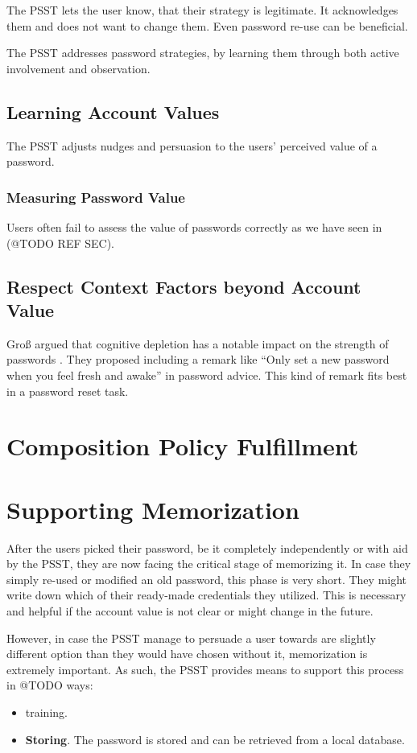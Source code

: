 The PSST lets the user know, that their strategy is legitimate. It acknowledges them and does not want to change them.  Even password re-use can be beneficial.

The PSST addresses password strategies, by learning them through both active involvement and observation. 


\subsection{Learning Account Values}
The PSST adjusts nudges and persuasion to the users' perceived value of a password. 

\subsubsection{Measuring Password Value}
Users often fail to assess the value of passwords correctly as we have seen in (@TODO REF SEC). 

\subsection{Respect Context Factors beyond Account Value}
Groß \etal argued that cognitive depletion has a notable impact on the strength of passwords \cite{Gross2016EffectCognitiveEffort}. They proposed including a remark like ``Only set a new password when you feel fresh and awake'' in password advice. This kind of remark fits best in a password reset task. 


\section{Composition Policy Fulfillment}

\section{Supporting Memorization}
After the users picked their password, be it completely independently or with aid by the PSST, they are now facing the critical stage of memorizing it. In case they simply re-used or modified an old password, this phase is very short. They might write down which of their ready-made credentials they utilized. This is necessary and helpful if the account value is not clear or might change in the future. 

However, in case the PSST manage to persuade a user towards are slightly different option than they would have chosen without it, memorization is extremely important. As such, the PSST provides means to support this process in @TODO ways:
\begin{itemize}
\item training. 
\item \textbf{Storing}. The password is stored and can be retrieved from a local database. 
\end{itemize}

